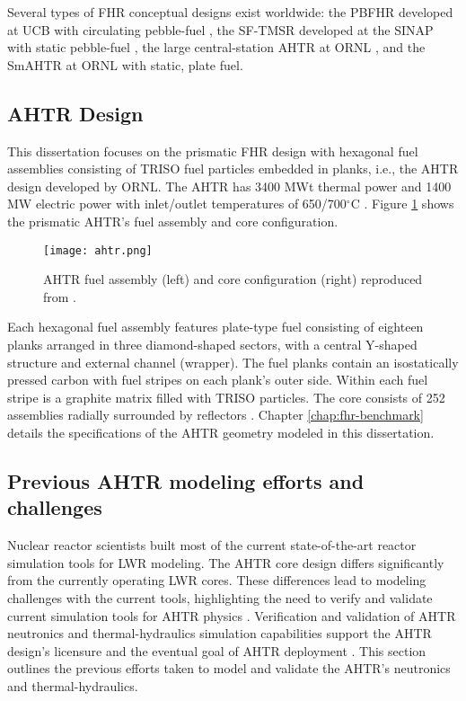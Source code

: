 Several types of \gls{FHR} conceptual designs exist worldwide: the \gls{PBFHR} 
developed at \gls{UCB} with circulating pebble-fuel 
\cite{scarlat_current_2014,krumwiede_three-dimensional_2013}, the \gls{SF-TMSR} 
developed at the \gls{SINAP} with static pebble-fuel \cite{liu_preliminary_2016}, 
the large central-station \gls{AHTR} at \gls{ORNL} \cite{holcomb_core_2011, varma_ahtr_2012}, 
and the \gls{SmAHTR} at ORNL \cite{greene_pre-conceptual_2010} with static, 
plate fuel. 

\subsection{\acrlong{AHTR} Design}
This dissertation focuses on the prismatic \gls{FHR} design with hexagonal fuel 
assemblies consisting of \gls{TRISO} fuel particles embedded in planks, i.e., 
the \gls{AHTR} design developed by ORNL. 
The \gls{AHTR} has 3400 MWt thermal power and 1400 MW electric power with
inlet/outlet temperatures of 650/700$^{\circ}$C \cite{varma_ahtr_2012}.  
Figure \ref{fig:ahtr} shows the prismatic AHTR's fuel assembly and core 
configuration.  
\begin{figure}[htb!]
    \centering
    \texttt{[image: ahtr.png]} 
    \caption{\acrlong{AHTR} fuel assembly (left) and core configuration (right) 
    reproduced from \cite{ramey_monte_2018}.}
    \label{fig:ahtr}
\end{figure}
Each hexagonal fuel assembly features plate-type fuel consisting of eighteen 
planks arranged in three diamond-shaped sectors, with a central Y-shaped 
structure and external channel (wrapper).
The fuel planks contain an isostatically pressed carbon with fuel stripes 
on each plank's outer side.
Within each fuel stripe is a graphite matrix filled with \gls{TRISO} particles. 
The core consists of 252 assemblies radially surrounded by reflectors
\cite{ramey_monte_2018}. 
Chapter \ref{chap:fhr-benchmark} details the specifications of the AHTR geometry
modeled in this dissertation.

\subsection{Previous AHTR modeling efforts and challenges} 
\label{sec:previous_ahtr}
Nuclear reactor scientists built most of the current state-of-the-art reactor simulation 
tools for \gls{LWR} modeling.
The \gls{AHTR} core design differs significantly from the currently operating \gls{LWR} 
cores.  
These differences lead to modeling challenges with the current tools, highlighting
the need to verify and validate current simulation tools for \gls{AHTR} physics 
\cite{ramey_monte_2018}. 
Verification and validation of \gls{AHTR} neutronics and thermal-hydraulics 
simulation capabilities support the \gls{AHTR} design's licensure and the
eventual goal of \gls{AHTR} deployment 
\cite{rahnema_phenomena_2019,rahnema_current_2015}.
This section outlines the previous efforts taken to model and validate 
the \gls{AHTR}'s neutronics and thermal-hydraulics. 

